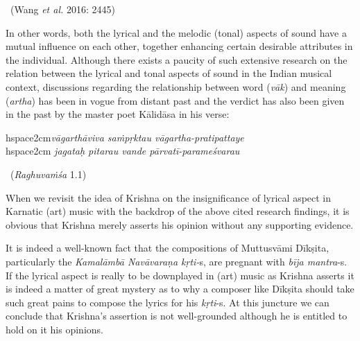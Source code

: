 \vspace{-.3cm}

\begin{myquote}

~\hfill (Wang \textit{et al.} 2016: 2445)
\end{myquote}

In other words, both the lyrical and the melodic (tonal) aspects of sound have a mutual influence on each other, together enhancing certain desirable attributes in the individual. Although there exists a paucity of such extensive research on the relation between the lyrical and tonal aspects of sound in the Indian musical context, discussions regarding the relationship between word (\textit{vāk}) and meaning (\textit{artha}) has been in vogue from distant past and the verdict has also been given in the past by the master poet Kālidāsa in his verse:

\vspace{.1cm}

\begin{myquote}
hspace{2cm}\textit{vāgarthāviva saṁpṛktau vāgartha-pratipattaye  }\\hspace{2cm} \textit{jagataḥ pitarau vande pārvatī-parameśvarau } 

~\hfill (\textit{Raghuvaṁśa} 1.1)
\end{myquote}

\vspace{.1cm}

When we revisit the idea of Krishna on the insignificance of lyrical aspect in Karnatic (art) music with the backdrop of the above cited research findings, it is obvious that Krishna merely asserts his opinion without any supporting evidence.

It is indeed a well-known fact that the compositions of Muttusvāmi Dīkṣita, particularly the \textit{Kamalāmbā Navāvaraṇa kṛti-}s, are pregnant with \textit{bīja mantra}-s. If the lyrical aspect is really to be downplayed in (art) music as Krishna asserts it is indeed a matter of great mystery as to why a composer like Dīkṣita should take such great pains to compose the lyrics for his \textit{kṛti}-s. At this juncture we can conclude that Krishna’s assertion is not well-grounded although he is entitled to hold on it his opinions.

